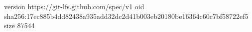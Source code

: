 version https://git-lfs.github.com/spec/v1
oid sha256:17ec885b4dd82438a935add32dc2d41b003eb20180be16364c60c7bf58722ef5
size 87544
